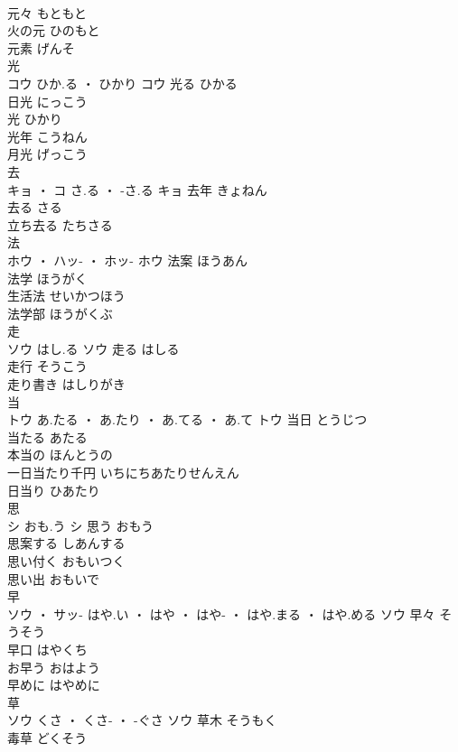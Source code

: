 \documentclass[8pt]{extreport}
\begin{document}
\begin{CJK}{UTF8}{min}
\\	元々	もともと	
\\	火の元	ひのもと	
\\	元素	げんそ	
\\	光	
\\	コウ	ひか.る ・ ひかり	コウ	光る	ひかる	
\\	日光	にっこう	
\\	光	ひかり	
\\	光年	こうねん	
\\	月光	げっこう	
\\	去	
\\	キョ ・ コ	さ.る ・ -さ.る	キョ	去年	きょねん	
\\	去る	さる	
\\	立ち去る	たちさる	
\\	法	
\\	ホウ ・ ハッ- ・ ホッ-		ホウ	法案	ほうあん	
\\	法学	ほうがく	
\\	生活法	せいかつほう	
\\	法学部	ほうがくぶ	
\\	走	
\\	ソウ	はし.る	ソウ	走る	はしる	
\\	走行	そうこう	
\\	走り書き	はしりがき	
\\	当	
\\	トウ	あ.たる ・ あ.たり ・ あ.てる ・ あ.て	トウ	当日	とうじつ	
\\	当たる	あたる	
\\	本当の	ほんとうの	
\\	一日当たり千円	いちにちあたりせんえん	
\\	日当り	ひあたり	
\\	思	
\\	シ	おも.う	シ	思う	おもう	
\\	思案する	しあんする	
\\	思い付く	おもいつく	
\\	思い出	おもいで	
\\	早	
\\	ソウ ・ サッ-	はや.い ・ はや ・ はや- ・ はや.まる ・ はや.める	ソウ	早々	そうそう	
\\	早口	はやくち	
\\	お早う	おはよう	
\\	早めに	はやめに	
\\	草	
\\	ソウ	くさ ・ くさ- ・ -ぐさ	ソウ	草木	そうもく	
\\	毒草	どくそう	

\end{CJK}
\end{document}
